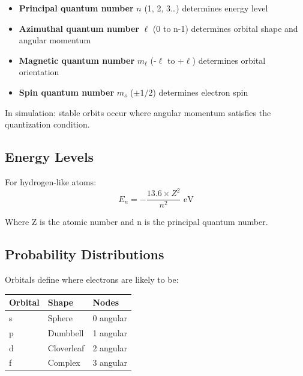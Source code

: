 \documentclass[
  11pt,
  letterpaper,
  twoside,
  openright]{book}
\providecommand{\tightlist}{%
  \setlength{\itemsep}{0pt}\setlength{\parskip}{0pt}}
\begin{document}
\begin{tcolorbox}[enhanced jigsaw, leftrule=.75mm, title=\textcolor{quarto-callout-note-color}{\faInfo}\hspace{0.5em}{Quantum Numbers}, bottomrule=.15mm, opacityback=0, coltitle=black, arc=.35mm, colframe=quarto-callout-note-color-frame, colbacktitle=quarto-callout-note-color!10!white, colback=white, titlerule=0mm, breakable, bottomtitle=1mm, toptitle=1mm, rightrule=.15mm, toprule=.15mm, left=2mm, opacitybacktitle=0.6]

\begin{itemize}
\tightlist
\item
  \textbf{Principal quantum number} \(n\) (1, 2, 3\ldots) determines
  energy level
\item
  \textbf{Azimuthal quantum number} \(\ell\) (0 to n-1) determines
  orbital shape and angular momentum
\item
  \textbf{Magnetic quantum number} \(m_\ell\) (-\(\ell\) to +\(\ell\))
  determines orbital orientation
\item
  \textbf{Spin quantum number} \(m_s\) (\(\pm 1/2\)) determines electron
  spin
\end{itemize}

\end{tcolorbox}

In simulation: stable orbits occur where angular momentum satisfies the
quantization condition.

\subsection{Energy Levels}\label{energy-levels}

For hydrogen-like atoms: \[
E_n = -\frac{13.6 \times Z^2}{n^2} \text{ eV}
\]

Where Z is the atomic number and n is the principal quantum number.

\subsection{Probability Distributions}\label{probability-distributions}

Orbitals define where electrons are likely to be:

\begin{longtable}[]{@{}lll@{}}
\toprule\noalign{}
Orbital & Shape & Nodes \\
\midrule\noalign{}
\endhead
\bottomrule\noalign{}
\endlastfoot
s & Sphere & 0 angular \\
p & Dumbbell & 1 angular \\
d & Cloverleaf & 2 angular \\
f & Complex & 3 angular \\
\end{longtable}
\end{document}
